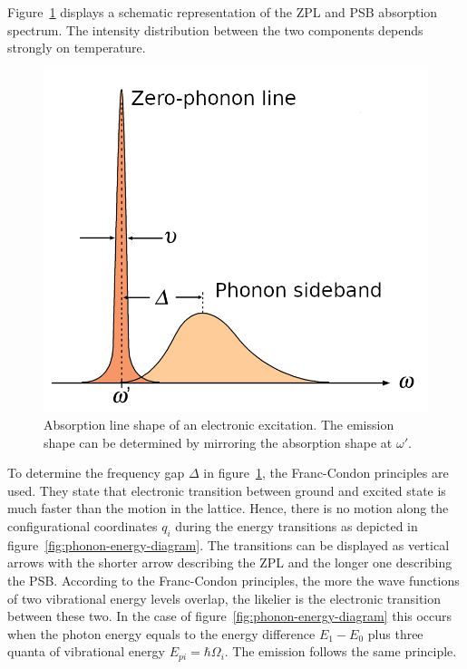 Figure~\ref{fig:line-shape} displays a schematic representation of the \ac{ZPL} and \ac{PSB} absorption spectrum.
The intensity distribution between the two components depends strongly on temperature.
\begin{figure}[H]
	\centering
	\includegraphics[width=0.6\linewidth]{figures/quantum-dot/Line-shape}
	\caption[Absorption line shape of an electronic excitation.]{Absorption line shape of an electronic excitation.
		The emission shape can be determined by mirroring the absorption shape at $\omega'$.}
	\label{fig:line-shape}
\end{figure}
To determine the frequency gap $\Delta$ in figure~\ref{fig:line-shape}, the Franc-Condon principles are used.
They state that electronic transition between ground and excited state is much faster than the motion in the lattice.
Hence, there is no motion along the configurational coordinates $q_i$ during the energy transitions as depicted in figure~\ref{fig:phonon-energy-diagram}.
The transitions can be displayed as vertical arrows with the shorter arrow describing the \ac{ZPL} and the longer one describing the \ac{PSB}.
According to the Franc-Condon principles, the more the wave functions of two vibrational energy levels overlap, the likelier is the electronic transition between these two.
In the case of figure~\ref{fig:phonon-energy-diagram} this occurs when the photon energy equals to the energy difference $E_1-E_0$ plus three quanta of vibrational energy $E_{pi} = \hbar \Omega_i$.
The emission follows the same principle.

